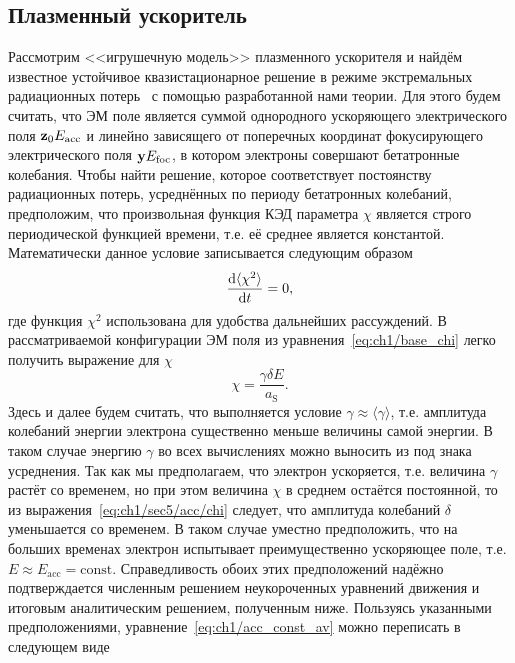\subsection{Плазменный ускоритель}
\label{sub:ch1/sec5/Accelerator}
Рассмотрим <<игрушечную модель>> плазменного ускорителя и найдём известное устойчивое квазистационарное решение в режиме экстремальных радиационных потерь~\cite{kostyukov2012radiative, golovanov2021radiation} с помощью разработанной нами теории.
Для этого будем считать, что ЭМ поле является суммой однородного ускоряющего электрического поля $\vb{z}_0 E_\mathrm{acc}$ и линейно зависящего от поперечных координат фокусирующего электрического поля $\vb{y} E_\mathrm{foc}$, в котором электроны совершают бетатронные колебания.
Чтобы найти решение, которое соответствует постоянству радиационных потерь, усреднённых по периоду бетатронных колебаний, предположим, что произвольная функция КЭД параметра $\chi$ является строго периодической функцией времени, т.е. её среднее является константой.
Математически данное условие записывается следующим образом
\begin{equation}
    \label{eq:ch1/acc_const_av}
    \dv{\langle \chi^2 \rangle}{t} = 0 ,
\end{equation}
где функция $\chi^2$ использована для удобства дальнейших рассуждений.
В рассматриваемой конфигурации ЭМ поля из уравнения~\eqref{eq:ch1/base_chi} легко получить выражение для $\chi$
\begin{equation}
    \label{eq:ch1/sec5/acc/chi}
    \chi = \frac{\gamma \delta E}{a_\mathrm{S}}.
\end{equation}
Здесь и далее будем считать, что выполняется условие $\gamma \approx \langle \gamma \rangle$, т.е. амплитуда колебаний энергии электрона существенно меньше величины самой энергии.
В таком случае энергию $\gamma$ во всех вычислениях можно выносить из под знака усреднения.
Так как мы предполагаем, что электрон ускоряется, т.е. величина $\gamma$ растёт со временем, но при этом величина $\chi$ в среднем остаётся постоянной, то из выражения~\eqref{eq:ch1/sec5/acc/chi} следует, что амплитуда колебаний $\delta$ уменьшается со временем.
В таком случае уместно предположить, что на больших временах электрон испытывает преимущественно ускоряющее поле, т.е. $E \approx E_\mathrm{acc}=\text{const}$.
Справедливость обоих этих предположений надёжно подтверждается численным решением неукороченных уравнений движения и итоговым аналитическим решением, полученным ниже.
Пользуясь указанными предположениями, уравнение~\eqref{eq:ch1/acc_const_av} можно переписать в следующем виде

